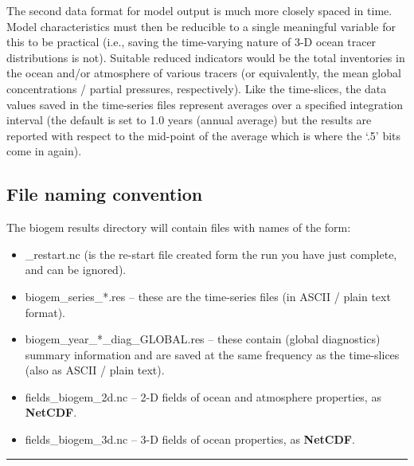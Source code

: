 The second data format for model output is much more closely spaced in time. Model characteristics must then be reducible to a single meaningful variable for this to be practical (i.e., saving the time-varying nature of 3-D ocean tracer distributions is not). Suitable reduced indicators would be the total inventories in the ocean and/or atmosphere of various tracers (or equivalently, the mean global concentrations / partial pressures, respectively). Like the time-slices, the data values saved in the time-series files represent averages over a specified integration interval (the default is set to 1.0 years (annual average) but the results are reported with respect to the mid-point of the average which is where the ‘.5’ bits come in again).


\subsection{File naming convention}

The \textsf{\footnotesize biogem} results directory will contain files with names of the form:

\vspace{1mm}
\begin{itemize}[noitemsep]
\setlength{\itemindent}{.2in}
\item \textsf{\footnotesize \_restart.nc} (is the re-start file created form the run you have just complete, and can be ignored).
\item \textsf{\footnotesize biogem\_series\_*.res} – these are the time-series files (in ASCII / plain text format).
\item \textsf{\footnotesize biogem\_year\_*\_diag\_GLOBAL.res} – these contain (global diagnostics) summary information and are saved at the same frequency as the time-slices (also as ASCII / plain text).
\item \textsf{\footnotesize fields\_biogem\_2d.nc} – 2-D fields of ocean and atmosphere properties, as \textbf{NetCDF}.
\item \textsf{\footnotesize fields\_biogem\_3d.nc} – 3-D fields of ocean properties, as \textbf{NetCDF}.
\end{itemize}
\vspace{1mm}

\vspace{1mm}
\noindent\rule{4cm}{0.1mm}

